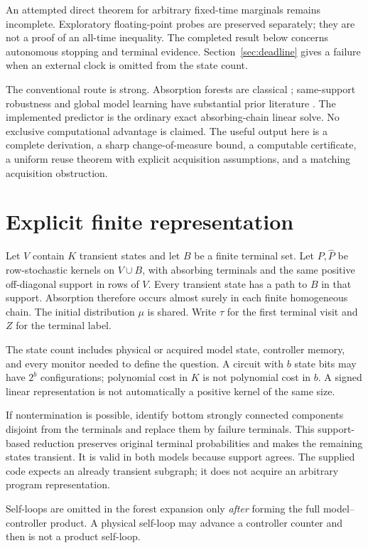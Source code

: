 \documentclass[11pt]{article}
\begin{document}
An attempted direct theorem for arbitrary fixed-time marginals remains
incomplete. Exploratory floating-point probes are preserved separately;
they are not a proof of an all-time inequality. The completed result below
concerns autonomous stopping and terminal evidence. Section~\ref{sec:deadline}
gives a failure when an external clock is omitted from the state count.

The conventional route is strong. Absorption forests are classical
\cite{leighton,chatterjee}; same-support robustness and global model
learning have substantial prior literature \cite{chatterjee,bazille}.
The implemented predictor is the ordinary exact absorbing-chain linear
solve. No exclusive computational advantage is claimed. The useful output
here is a complete derivation, a sharp change-of-measure bound, a
computable certificate, a uniform reuse theorem with explicit acquisition
assumptions, and a matching acquisition obstruction.

\section{Explicit finite representation}

Let $V$ contain $K$ transient states and let $B$ be a finite terminal set.
Let $P,\widehat P$ be row-stochastic kernels on $V\cup B$, with absorbing
terminals and the same positive off-diagonal support in rows of $V$.
Every transient state has a path to $B$ in that support. Absorption
therefore occurs almost surely in each finite homogeneous chain.
The initial distribution $\mu$ is shared. Write $\tau$ for the first
terminal visit and $Z$ for the terminal label.

The state count includes physical or acquired model state, controller
memory, and every monitor needed to define the question. A circuit with
$b$ state bits may have $2^b$ configurations; polynomial cost in $K$
is not polynomial cost in $b$. A signed linear representation is not
automatically a positive kernel of the same size.

If nontermination is possible, identify bottom strongly connected
components disjoint from the terminals and replace them by failure
terminals. This support-based reduction preserves original terminal
probabilities and makes the remaining states transient. It is valid in
both models because support agrees. The supplied code expects an already
transient subgraph; it does not acquire an arbitrary program representation.

Self-loops are omitted in the forest expansion only \emph{after} forming
the full model--controller product. A physical self-loop may advance a
controller counter and then is not a product self-loop.
\end{document}
